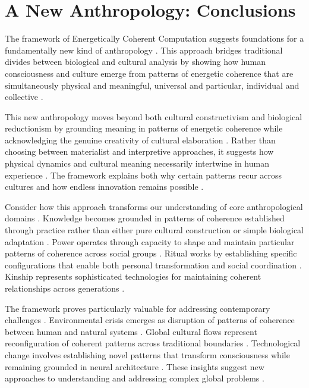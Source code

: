 \section{A New Anthropology: Conclusions}

The framework of Energetically Coherent Computation suggests foundations for a fundamentally new kind of anthropology \cite{rabinow2008marking, fischer2018anthropology}. This approach bridges traditional divides between biological and cultural analysis by showing how human consciousness and culture emerge from patterns of energetic coherence that are simultaneously physical and meaningful, universal and particular, individual and collective \cite{bloch2012anthropology}.

This new anthropology moves beyond both cultural constructivism and biological reductionism by grounding meaning in patterns of energetic coherence while acknowledging the genuine creativity of cultural elaboration \cite{strathern2004commons, latour2005reassembling}. Rather than choosing between materialist and interpretive approaches, it suggests how physical dynamics and cultural meaning necessarily intertwine in human experience \cite{csordas1990embodiment}. The framework explains both why certain patterns recur across cultures and how endless innovation remains possible \cite{wagner2016invention}.

Consider how this approach transforms our understanding of core anthropological domains \cite{fischer2018anthropology}. Knowledge becomes grounded in patterns of coherence established through practice rather than either pure cultural construction or simple biological adaptation \cite{ingold2013making}. Power operates through capacity to shape and maintain particular patterns of coherence across social groups \cite{wolf1999envisioning}. Ritual works by establishing specific configurations that enable both personal transformation and social coordination \cite{kapferer2004ritual}. Kinship represents sophisticated technologies for maintaining coherent relationships across generations \cite{carsten2004after, strathern1992after}.

The framework proves particularly valuable for addressing contemporary challenges \cite{latour2017facing, tsing2015mushroom}. Environmental crisis emerges as disruption of patterns of coherence between human and natural systems \cite{kohn2013how}. Global cultural flows represent reconfiguration of coherent patterns across traditional boundaries \cite{appadurai1996modernity}. Technological change involves establishing novel patterns that transform consciousness while remaining grounded in neural architecture \cite{hayles2012how}. These insights suggest new approaches to understanding and addressing complex global problems \cite{fortun2012ethnography}.


